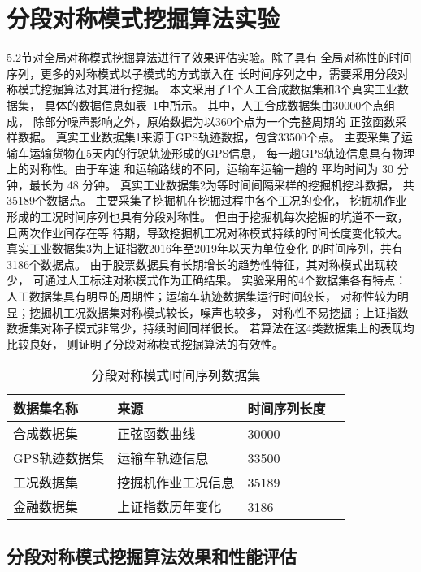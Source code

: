 \section{分段对称模式挖掘算法实验}

5.2节对全局对称模式挖掘算法进行了效果评估实验。除了具有
全局对称性的时间序列，更多的对称模式以子模式的方式嵌入在
长时间序列之中，需要采用分段对称模式挖掘算法对其进行挖掘。
本文采用了1个人工合成数据集和3个真实工业数据集，
具体的数据信息如表~\ref{tab:segment_dataset}中所示。
其中，人工合成数据集由30000个点组成，
除部分噪声影响之外，原始数据为以360个点为一个完整周期的
正弦函数采样数据。
真实工业数据集1来源于GPS轨迹数据，包含33500个点。
主要采集了运输车运输货物在5天内的行驶轨迹形成的GPS信息，
每一趟GPS轨迹信息具有物理上的对称性。由于车速
和运输路线的不同，运输车运输一趟的
平均时间为 30 分钟，最长为 48 分钟。
真实工业数据集2为等时间间隔采样的挖掘机挖斗数据，
共35189个数据点。
主要采集了挖掘机在挖掘过程中各个工况的变化，
挖掘机作业形成的工况时间序列也具有分段对称性。
但由于挖掘机每次挖掘的坑道不一致，且两次作业间存在等
待期，导致挖掘机工况对称模式持续的时间长度变化较大。
真实工业数据集3为上证指数2016年至2019年以天为单位变化
的时间序列，共有3186个数据点。
由于股票数据具有长期增长的趋势性特征，其对称模式出现较少，
可通过人工标注对称模式作为正确结果。
实验采用的4个数据集各有特点：
人工数据集具有明显的周期性；运输车轨迹数据集运行时间较长，
对称性较为明显；挖掘机工况数据集对称模式较长，噪声也较多，
对称性不易挖掘；上证指数数据集对称子模式非常少，持续时间同样很长。
若算法在这4类数据集上的表现均比较良好，
则证明了分段对称模式挖掘算法的有效性。

\begin{table}
  \centering
  \caption{分段对称模式时间序列数据集}
  \begin{tabular}{llll}
    \toprule
    数据集名称       & 来源                   & 时间序列长度  \\
    \midrule
    合成数据集       & 正弦函数曲线           & 30000               \\
    GPS轨迹数据集 & 运输车轨迹信息       & 33500              \\
    工况数据集 & 挖掘机作业工况信息 & 35189              \\
    金融数据集       & 上证指数历年变化       & 3186               \\
    \bottomrule
  \end{tabular}
  \label{tab:segment_dataset}
\end{table}

\subsection{分段对称模式挖掘算法效果和性能评估}

